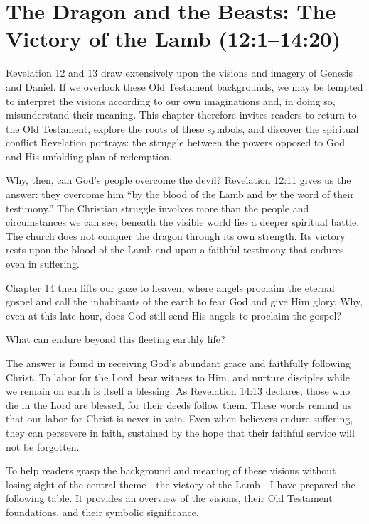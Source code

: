 \chapter{The Dragon and the Beasts: The Victory of the Lamb (12:1--14:20)}

Revelation 12 and 13 draw extensively upon the visions and imagery of Genesis and Daniel. If we overlook these Old Testament backgrounds, we may be tempted to interpret the visions according to our own imaginations and, in doing so, misunderstand their meaning. This chapter therefore invites readers to return to the Old Testament, explore the roots of these symbols, and discover the spiritual conflict Revelation portrays: the struggle between the powers opposed to God and His unfolding plan of redemption.

Why, then, can God's people overcome the devil? Revelation 12:11 gives us the answer: they overcome him “by the blood of the Lamb and by the word of their testimony.” The Christian struggle involves more than the people and circumstances we can see; beneath the visible world lies a deeper spiritual battle. The church does not conquer the dragon through its own strength. Its victory rests upon the blood of the Lamb and upon a faithful testimony that endures even in suffering.

Chapter 14 then lifts our gaze to heaven, where angels proclaim the eternal gospel and call the inhabitants of the earth to fear God and give Him glory. Why, even at this late hour, does God still send His angels to proclaim the gospel?

What can endure beyond this fleeting earthly life?

The answer is found in receiving God's abundant grace and faithfully following Christ. To labor for the Lord, bear witness to Him, and nurture disciples while we remain on earth is itself a blessing. As Revelation 14:13 declares, those who die in the Lord are blessed, for their deeds follow them. These words remind us that our labor for Christ is never in vain. Even when believers endure suffering, they can persevere in faith, sustained by the hope that their faithful service will not be forgotten.

To help readers grasp the background and meaning of these visions without losing sight of the central theme—the victory of the Lamb—I have prepared the following table. It provides an overview of the visions, their Old Testament foundations, and their symbolic significance.

